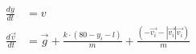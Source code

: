 \documentclass[preview]{standalone}
\begin{document}
\begin{align*}
\quad\\
            \frac{d y }{dt}&=v    \quad\\
            \frac{d\vec{v}}{dt}&=\vec{g}+\frac{k\cdot(80- y _i-l)}{m}+\frac{(-\vec{v_i}-|\vec{v_i}|\vec{v_i})}{m}
\end{align*}
\end{document}
